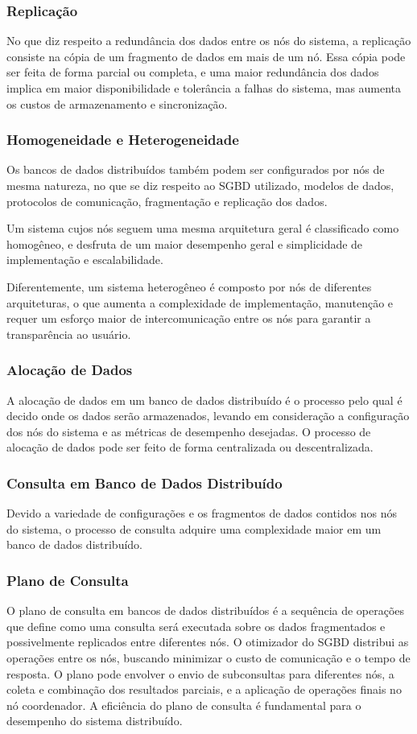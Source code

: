 \subsubsection{Replicação}
No que diz respeito a redundância dos dados entre os nós do sistema,
a replicação consiste na cópia de um fragmento de dados em mais de um nó. 
Essa cópia pode ser feita de forma parcial ou completa, e uma maior redundância dos dados 
implica em maior disponibilidade e tolerância a falhas do sistema, mas aumenta os custos de armazenamento e sincronização.

\subsubsection{Homogeneidade e Heterogeneidade}
Os bancos de dados distribuídos também podem ser configurados por nós de mesma natureza,
no que se diz respeito ao SGBD utilizado, modelos de dados, protocolos de comunicação,
fragmentação e replicação dos dados. 

Um sistema cujos nós seguem uma mesma arquitetura geral é classificado como homogêneo, 
e desfruta de um maior desempenho geral e simplicidade de implementação e escalabilidade.

Diferentemente, um sistema heterogêneo é composto por nós de diferentes arquiteturas,
o que aumenta a complexidade de implementação, manutenção e requer um esforço maior
de intercomunicação entre os nós para garantir a transparência ao usuário. 

\subsubsection{Alocação de Dados}
A alocação de dados em um banco de dados distribuído é o processo pelo qual é decido onde os dados serão armazenados,
levando em consideração a configuração dos nós do sistema e as métricas de desempenho desejadas.
O processo de alocação de dados pode ser feito de forma centralizada ou descentralizada.

\subsubsection{Consulta em Banco de Dados Distribuído}
Devido a variedade de configurações e os fragmentos de dados contidos nos nós do sistema,
o processo de consulta adquire uma complexidade maior em um banco de dados distribuído.

\subsubsection{Plano de Consulta}
O plano de consulta em bancos de dados distribuídos é a sequência de operações que define como uma consulta será executada 
sobre os dados fragmentados e possivelmente replicados entre diferentes nós.
O otimizador do SGBD distribui as operações entre os nós, buscando minimizar o custo de comunicação e o tempo de resposta. 
O plano pode envolver o envio de subconsultas para diferentes nós, a coleta e combinação dos resultados parciais, e a aplicação de operações finais no nó coordenador.
A eficiência do plano de consulta é fundamental para o desempenho do sistema distribuído.

